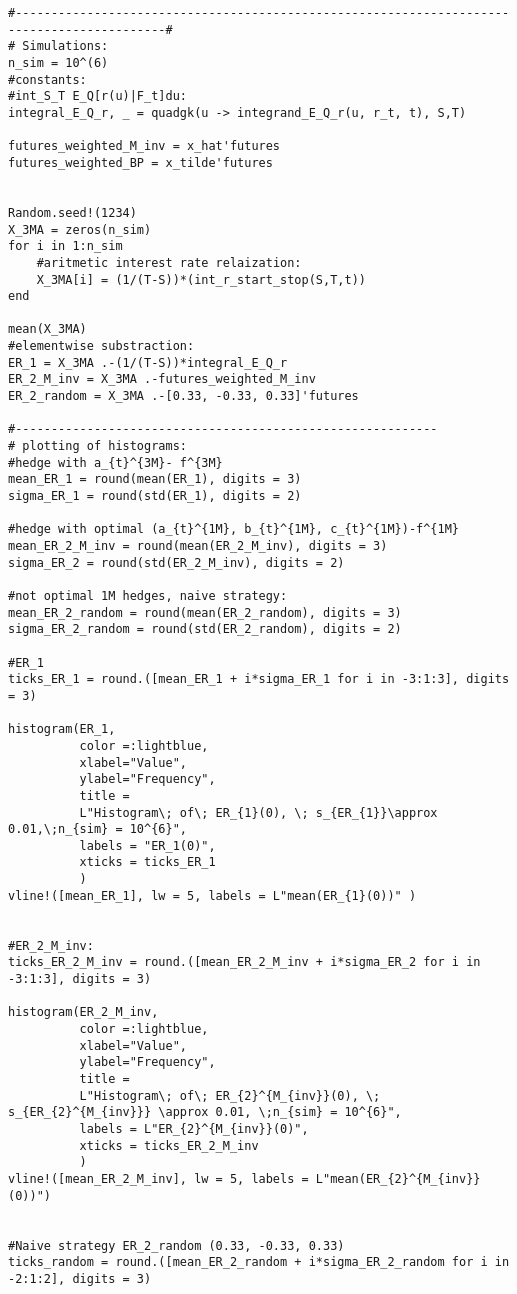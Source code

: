 \begin{verbatim}
#-------------------------------------------------------------------------------------------#
# Simulations: 
n_sim = 10^(6)
#constants: 
#int_S_T E_Q[r(u)|F_t]du:
integral_E_Q_r, _ = quadgk(u -> integrand_E_Q_r(u, r_t, t), S,T)

futures_weighted_M_inv = x_hat'futures
futures_weighted_BP = x_tilde'futures


Random.seed!(1234)
X_3MA = zeros(n_sim)
for i in 1:n_sim
    #aritmetic interest rate relaization:
    X_3MA[i] = (1/(T-S))*(int_r_start_stop(S,T,t))
end

mean(X_3MA)
#elementwise substraction:
ER_1 = X_3MA .-(1/(T-S))*integral_E_Q_r
ER_2_M_inv = X_3MA .-futures_weighted_M_inv
ER_2_random = X_3MA .-[0.33, -0.33, 0.33]'futures

#-----------------------------------------------------------
# plotting of histograms: 
#hedge with a_{t}^{3M}- f^{3M}
mean_ER_1 = round(mean(ER_1), digits = 3)
sigma_ER_1 = round(std(ER_1), digits = 2) 

#hedge with optimal (a_{t}^{1M}, b_{t}^{1M}, c_{t}^{1M})-f^{1M}
mean_ER_2_M_inv = round(mean(ER_2_M_inv), digits = 3)
sigma_ER_2 = round(std(ER_2_M_inv), digits = 2)

#not optimal 1M hedges, naive strategy:  
mean_ER_2_random = round(mean(ER_2_random), digits = 3)
sigma_ER_2_random = round(std(ER_2_random), digits = 2)

#ER_1
ticks_ER_1 = round.([mean_ER_1 + i*sigma_ER_1 for i in -3:1:3], digits = 3)

histogram(ER_1, 
          color =:lightblue, 
          xlabel="Value", 
          ylabel="Frequency", 
          title = 
          L"Histogram\; of\; ER_{1}(0), \; s_{ER_{1}}\approx 0.01,\;n_{sim} = 10^{6}", 
          labels = "ER_1(0)", 
          xticks = ticks_ER_1
          )
vline!([mean_ER_1], lw = 5, labels = L"mean(ER_{1}(0))" )


#ER_2_M_inv:
ticks_ER_2_M_inv = round.([mean_ER_2_M_inv + i*sigma_ER_2 for i in -3:1:3], digits = 3)

histogram(ER_2_M_inv, 
          color =:lightblue, 
          xlabel="Value", 
          ylabel="Frequency", 
          title = 
          L"Histogram\; of\; ER_{2}^{M_{inv}}(0), \; s_{ER_{2}^{M_{inv}}} \approx 0.01, \;n_{sim} = 10^{6}", 
          labels = L"ER_{2}^{M_{inv}}(0)", 
          xticks = ticks_ER_2_M_inv
          )
vline!([mean_ER_2_M_inv], lw = 5, labels = L"mean(ER_{2}^{M_{inv}}(0))")


#Naive strategy ER_2_random (0.33, -0.33, 0.33)
ticks_random = round.([mean_ER_2_random + i*sigma_ER_2_random for i in -2:1:2], digits = 3)


\end{verbatim}
